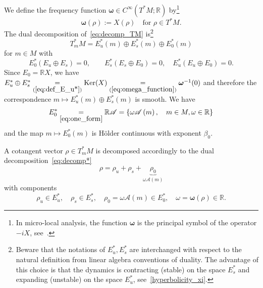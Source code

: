 \documentclass[AHL,Unicode,longabstracts,published]{cedram}
\newcommand*\eq[1]{\underset{(#1)}{=}}
\newcommand{\Kerr}{\mathrm{Ker}}
\newcommand{\bbR}{\mathbb{R}}
\newcommand{\scrA}{\mathscr{A}}
\newcommand{\bbR}{\mathbb{R}}
\begin{document}
We define the frequency function $\boldsymbol{\omega}\in C^{\infty}(T^{*}M;\bbR)$ by\footnote{In micro-local analysis, the function $\boldsymbol{\omega}$ is the principal symbol of the operator $-iX$, see~\cite[footnote on p.~332.]{fred_flow_09}.}
\begin{equation}\label{eq:omega_function}
\boldsymbol{\omega}\left(\rho\right):=X\left(\rho\right)\quad\text{for }\rho\in T^{*}M.
\end{equation}
The dual decomposition of~\eqref{eq:decomp_TM} is\footnote{Beware that the notations of $E_{u}^{*},E_{s}^{*}$ are interchanged with respect to the natural definition from linear algebra conventions of duality. The advantage of this choice is that the dynamics is contracting (stable) on the space $E_{s}^{*}$ and expanding (unstable) on the space $E_{u}^{*}$, see~\eqref{hyperbolicity_xi}.}
\begin{equation}\label{eq:decomp*}
T_{m}^{*}M=E_{u}^{*}\left(m\right)\oplus E_{s}^{*}\left(m\right)\oplus E_{0}^{*}\left(m\right)
\end{equation}
for $m\in M$ with
\begin{equation}\label{eq:def_E_u*}
E_{0}^{*}\left(E_{u}\oplus E_{s}\right)=0,\qquad E_{s}^{*}\left(E_{s}\oplus E_{0}\right)=0,\quad E_{u}^{*}\left(E_{u}\oplus E_{0}\right)=0.
\end{equation}
Since $E_{0}=\bbR X$, we have $E_{u}^{*}\oplus E_{s}^{*}\eq{\ref{eq:def_E_u*}}\Kerr(X)\eq{\ref{eq:omega_function}}\boldsymbol{\omega}^{-1}(0)$ and therefore the correspondence $m\mapsto E_{u}^{*}(m)\oplus E_{s}^{*}(m)$ is smooth. We have
\begin{equation}\label{eq:def_E_0*}
E_{0}^{*}\underset{\eqref{eq:one_form}}{=}\bbR\scrA=\left\{ \omega\scrA\left(m\right),\quad m\in M,\omega\in\bbR\right\} 
\end{equation}
and the map $m\mapsto E_{0}^{*}(m)$ is H\"older continuous with exponent $\beta_{0}$.

A cotangent vector $\rho\in T_{m}^{*}M$ is decomposed accordingly to the dual decomposition~\eqref{eq:decomp*}
\begin{equation}\label{eq:decomp_Xi}
\rho=\rho_{u}+\rho_{s}+\underbrace{\rho_{0}}_{\omega\scrA\left(m\right)}
\end{equation}
with components
\[
\rho_{u}\in E_{u}^{*},\quad\rho_{s}\in E_{s}^{*},\quad\rho_{0}=\omega\scrA\left(m\right)\in E_{0}^{*},\quad\omega=\boldsymbol{\omega}\left(\rho\right)\in\bbR.
\]
\end{document}
